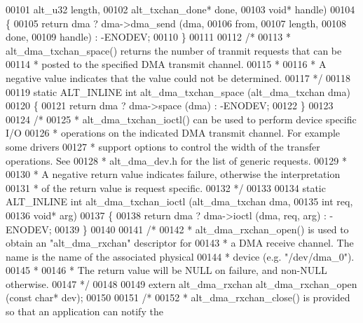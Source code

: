 \begin{DoxyCode}
00101              alt_u32 length,
00102              alt_txchan_done* done, 
00103              \textcolor{keywordtype}{void}* handle)
00104 \{
00105   \textcolor{keywordflow}{return} dma ? dma->dma_send (dma, 
00106         from, 
00107         length,
00108         done, 
00109         handle) : -ENODEV;
00110 \}
00111 
00112 \textcolor{comment}{/*}
00113 \textcolor{comment}{ * alt\_dma\_txchan\_space() returns the number of tranmit requests that can be }
00114 \textcolor{comment}{ * posted to the specified DMA transmit channel.}
00115 \textcolor{comment}{ *}
00116 \textcolor{comment}{ * A negative value indicates that the value could not be determined. }
00117 \textcolor{comment}{ */}
00118 
00119 \textcolor{keyword}{static} ALT_INLINE \textcolor{keywordtype}{int} alt_dma_txchan_space (alt_dma_txchan dma)
00120 \{
00121   \textcolor{keywordflow}{return} dma ? dma->space (dma) : -ENODEV;
00122 \}
00123 
00124 \textcolor{comment}{/*}
00125 \textcolor{comment}{ * alt\_dma\_txchan\_ioctl() can be used to perform device specific I/O }
00126 \textcolor{comment}{ * operations on the indicated DMA transmit channel. For example some drivers}
00127 \textcolor{comment}{ * support options to control the width of the transfer operations. See}
00128 \textcolor{comment}{ * alt\_dma\_dev.h for the list of generic requests.}
00129 \textcolor{comment}{ *}
00130 \textcolor{comment}{ * A negative return value indicates failure, otherwise the interpretation}
00131 \textcolor{comment}{ * of the return value is request specific.  }
00132 \textcolor{comment}{ */}
00133 
00134 \textcolor{keyword}{static} ALT_INLINE \textcolor{keywordtype}{int} alt_dma_txchan_ioctl (alt_dma_txchan dma, 
00135               \textcolor{keywordtype}{int}            req, 
00136               \textcolor{keywordtype}{void}*          arg)
00137 \{
00138   \textcolor{keywordflow}{return} dma ? dma->ioctl (dma, req, arg) : -ENODEV;
00139 \}
00140 
00141 \textcolor{comment}{/*}
00142 \textcolor{comment}{ * alt\_dma\_rxchan\_open() is used to obtain an "alt\_dma\_rxchan" descriptor for}
00143 \textcolor{comment}{ * a DMA receive channel. The name is the name of the associated physical}
00144 \textcolor{comment}{ * device (e.g. "/dev/dma\_0").}
00145 \textcolor{comment}{ *}
00146 \textcolor{comment}{ * The return value will be NULL on failure, and non-NULL otherwise. }
00147 \textcolor{comment}{ */}
00148 
00149 \textcolor{keyword}{extern} alt_dma_rxchan alt_dma_rxchan_open (\textcolor{keyword}{const} \textcolor{keywordtype}{char}* dev);
00150 
00151 \textcolor{comment}{/*}
00152 \textcolor{comment}{ * alt\_dma\_rxchan\_close() is provided so that an application can notify the }

\end{DoxyCode}
